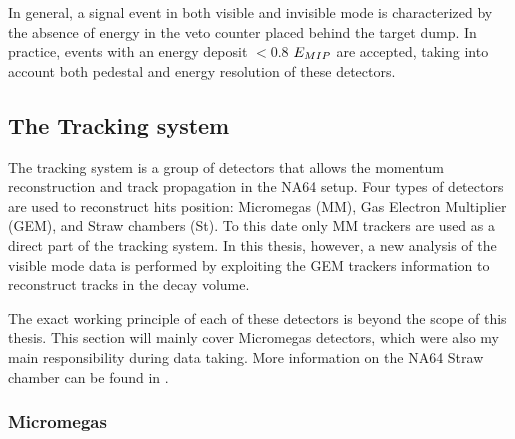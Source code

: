 In general, a signal event in both visible and invisible mode is characterized by the absence of energy in the veto counter placed behind the target dump. In practice, events with an energy deposit $<$0.8 $E_{MIP}$ are accepted, taking into account both pedestal and energy resolution of these detectors.

\subsection{The Tracking system}
\label{ch2:sec:detectors-tracking}

The tracking system is a group of detectors that allows the momentum reconstruction and track propagation in the NA64 setup. Four types of detectors are used to reconstruct hits position: Micromegas (MM), Gas Electron Multiplier (GEM), and Straw chambers (St). To this date only MM trackers are used as a direct part of the tracking system. In this thesis, however, a new analysis of the visible mode data is performed by exploiting the GEM trackers information to reconstruct tracks in the decay volume.

The exact working principle of each of these detectors is beyond the scope of this thesis. This section will mainly cover Micromegas detectors, which were also my main responsibility during data taking. More information on the NA64 Straw chamber can be found in \cite{pdegen-thesis}.

\subsubsection{Micromegas}

